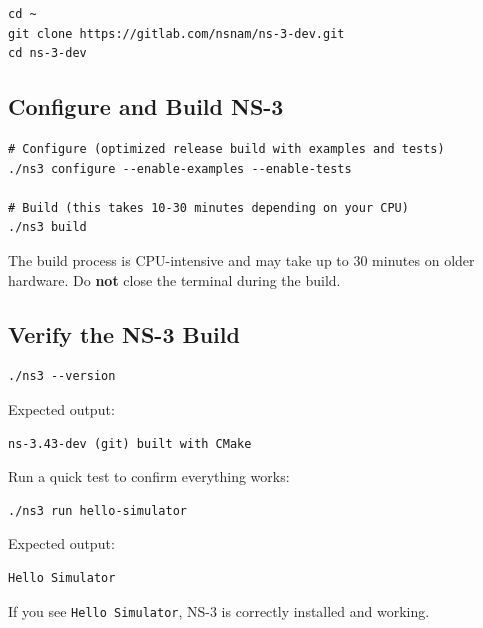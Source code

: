 \documentclass[12pt,a4paper]{article}
\newenvironment{warnbox}
  {\begin{tcolorbox}[
      colback   = warnyellow!15,
      colframe  = warnyellow!80!black,
      fonttitle = \bfseries,
      title     = \textcolor{warnyellow!80!black}{$\triangle$\; Warning},
      breakable
  ]}
  {\end{tcolorbox}}
\newenvironment{tipbox}
  {\begin{tcolorbox}[
      colback   = successgreen!8,
      colframe  = successgreen,
      fonttitle = \bfseries,
      title     = \textcolor{successgreen}{$\checkmark$\; Tip},
      breakable
  ]}
  {\end{tcolorbox}}
\begin{document}
\begin{lstlisting}[style=bash, caption={Clone NS-3 development repository}]
cd ~
git clone https://gitlab.com/nsnam/ns-3-dev.git
cd ns-3-dev
\end{lstlisting}

\subsection{Configure and Build NS-3}

\begin{lstlisting}[style=bash, caption={Configure NS-3 build}]
# Configure (optimized release build with examples and tests)
./ns3 configure --enable-examples --enable-tests

# Build (this takes 10-30 minutes depending on your CPU)
./ns3 build
\end{lstlisting}

\begin{warnbox}
The build process is CPU-intensive and may take up to 30 minutes on older hardware. Do \textbf{not} close the terminal during the build.
\end{warnbox}

\subsection{Verify the NS-3 Build}

\begin{lstlisting}[style=bash, caption={Verify NS-3 installation}]
./ns3 --version
\end{lstlisting}

Expected output:
\begin{lstlisting}[style=output]
ns-3.43-dev (git) built with CMake
\end{lstlisting}

Run a quick test to confirm everything works:

\begin{lstlisting}[style=bash, caption={Run the hello-simulator example}]
./ns3 run hello-simulator
\end{lstlisting}

Expected output:
\begin{lstlisting}[style=output]
Hello Simulator
\end{lstlisting}

\begin{tipbox}
If you see \texttt{Hello Simulator}, NS-3 is correctly installed and working.
\end{tipbox}
\end{document}
